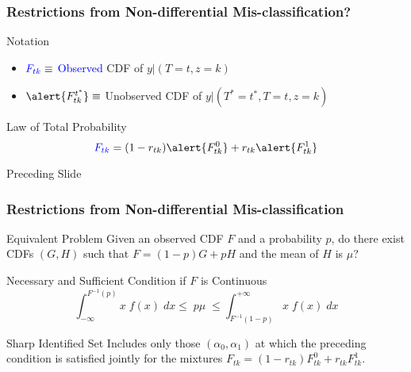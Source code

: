 \documentclass{beamer}
\begin{document}
\begin{frame}
  \frametitle{Restrictions from Non-differential Mis-classification?}

  \small
  \begin{block}{Notation}
    \begin{itemize}
      \item $\textcolor{blue}{F_{tk}} \equiv$ \textcolor{blue}{Observed} CDF of $y|(T=t,z=k)$
      \item $\alert{F^{t^*}_{tk}} \equiv$ \alert{Unobserved} CDF of $y|(T^*=t^*,T=t,z=k)$
    \end{itemize}
  \end{block}

  \begin{block}{Law of Total Probability}
    \vspace{-1em}
  \[
    \textcolor{blue}{F_{tk}} = (1 - r_{tk}) \alert{F^{0}_{tk}} + r_{tk}\alert{F^{1}_{tk}}
  \]
  \end{block}

  \begin{block}{Preceding Slide}

  \end{block}

\end{frame}
\begin{frame}
  \frametitle{Restrictions from Non-differential Mis-classification}

  \begin{block}{Equivalent Problem}
   Given an observed CDF $F$ and a probability $p$, do there exist CDFs $(G,H)$ such that $F = (1-p)G + pH$ and the mean of $H$ is $\mu$? 
  \end{block}

  \begin{alertblock}{Necessary and Sufficient Condition if $F$ is Continuous}
   \[
     \int_{-\infty}^{F^{-1}(p)} x\; f(x) \; dx \leq \; p \mu \; \leq \int_{F^{-1}(1-p)}^{+\infty} x \; f(x)\; dx
   \]
  \end{alertblock}

  \begin{block}{Sharp Identified Set}
    Includes only those $(\alpha_0, \alpha_1)$ at which the preceding condition is satisfied jointly for the mixtures $F_{tk} = (1 - r_{tk})F_{tk}^0 + r_{tk} F_{tk}^1$.
  \end{block}



\end{frame}
\end{document}
